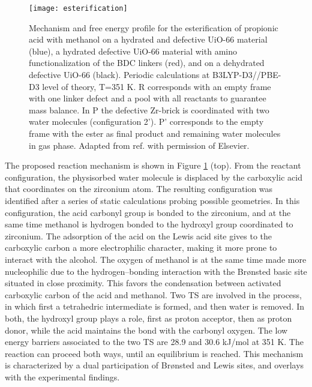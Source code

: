 \begin{figure}[!htbp]
	\centering
	\texttt{[image: esterification]}
	\caption{Mechanism and free energy profile for the esterification of propionic acid with methanol on a hydrated and defective UiO-66 material (blue), a hydrated defective UiO-66 material with amino functionalization of the BDC linkers (red), and on a dehydrated defective UiO-66 (black). Periodic calculations at B3LYP-D3//PBE-D3 level of theory, T=351 K. R corresponds with an empty frame with one linker defect and a pool with all reactants to guarantee mass balance. In P the defective Zr-brick is coordinated with two water molecules (configuration 2’). P’ corresponds to the empty frame with the ester as final product and remaining water molecules in gas phase. Adapted from ref. \cite{caratelli2017nature} with permission of Elsevier.}
	\label{fig:esterification}
\end{figure}
\npar
The proposed reaction mechanism is shown in Figure \ref{fig:esterification} (top). From the reactant configuration, the physisorbed water molecule is displaced by the carboxylic acid that coordinates on the zirconium atom. The resulting configuration was identified after a series of static calculations probing possible geometries. In this configuration, the acid carbonyl group is bonded to the zirconium, and at the same time methanol is hydrogen bonded to the hydroxyl group coordinated to zirconium. The adsorption of the acid on the Lewis acid site gives to the carboxylic carbon a more electrophilic character, making it more prone to interact with the alcohol. The oxygen of methanol is at the same time made more nucleophilic due to the hydrogen--bonding interaction with the Br\o{}nsted basic site situated in close proximity. This favors the condensation between activated carboxylic carbon of the acid and methanol. Two TS are involved in the process, in which first a tetrahedric intermediate is formed, and then water is removed. In both, the hydroxyl group plays a role, first as proton acceptor, then as proton donor, while the acid maintains the bond with the carbonyl oxygen. The low energy barriers associated to the two TS are 28.9 and 30.6 kJ/mol at 351 K. The reaction can proceed both ways, until an equilibrium is reached. This mechanism is characterized by a dual participation of Br\o{}nsted and Lewis sites, and overlays with the experimental findings.
\npar
